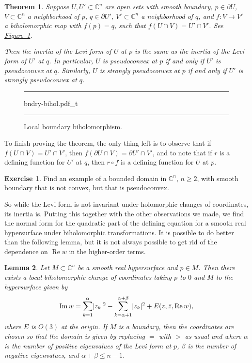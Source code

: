 \documentclass[12pt,openany]{book}
\newcommand{\avoidbreak}{\postdisplaypenalty=100}
\renewcommand{\Re}{\operatorname{Re}}
\renewcommand{\Im}{\operatorname{Im}}
\newcommand{\sabs}[1]{\lvert {#1} \rvert}
\newcommand{\C}{{\mathbb{C}}}
\theoremstyle{plain}
\newtheorem{thm}{Theorem}[section]
\newtheorem{lemma}[thm]{Lemma}
\theoremstyle{remark}
\theoremstyle{definition}
\newenvironment{exbox}{%
    \def\FrameCommand{\vrule width 1pt \relax\hspace{10pt}}%
    \MakeFramed{\advance\hsize-\width\FrameRestore}%
}{%
    \endMakeFramed
}
\newenvironment{myfig}{%
\begin{figure}[h!t]
\noindent\rule{\textwidth}{0.5pt}\vspace{12pt}\par\centering}%
{\par\noindent\rule{\textwidth}{0.5pt}
\end{figure}}
\theoremstyle{exercise}
\newtheorem{exercise}{Exercise}[section]
\theoremstyle{example}
\newcommand{\figureref}[1]{\hyperref[#1]{Figure~\ref*{#1}}}
\begin{document}
\begin{thm}
\pagebreak[2]
Suppose $U, U' \subset \C^n$ are open sets with smooth boundary,
$p \in \partial U$, $V \subset \C^n$ a neighborhood of $p$,
$q \in \partial U'$, $V' \subset \C^n$ a neighborhood of $q$,
and $f \colon V \to V'$ a biholomorphic map with $f(p) = q$, such that
$f(U \cap V) = U' \cap V'$.
See \figureref{fig:bndry-bihol}.

Then the inertia of the Levi form of $U$ at $p$ is the same as the inertia of
the Levi form of $U'$ at $q$.
In particular, $U$ is pseudoconvex at $p$ if and only if $U'$ is pseudoconvex at $q$.
Similarly,
$U$ is strongly pseudoconvex at $p$ if and only if $U'$ is strongly pseudoconvex at $q$.
\end{thm}

\begin{myfig}
{bndry-bihol.pdf_t}
\caption{Local boundary biholomorphism.\label{fig:bndry-bihol}}
\end{myfig}

To finish proving the theorem, the only thing left is to observe that if
$f(U \cap V) = U' \cap V'$, then $f(\partial U \cap V) = \partial U' \cap
V'$, and to note that if $r$ is a defining function for $U'$ at $q$,
then $r \circ f$ is a defining function for $U$ at $p$.

\begin{exbox}
\begin{exercise}
Find an example of a bounded domain in $\C^n$, $n \geq 2$, with smooth boundary that is not convex,
but that is pseudoconvex.
\end{exercise}
\end{exbox}

So while the Levi form is not invariant under holomorphic changes of coordinates,
its inertia is.
Putting this together with the other observations we made,
we find the normal form for the
quadratic part of the defining equation for a smooth real hypersurface
under biholomorphic transformations.
It is possible to do better than the following lemma, but it is not always possible
to get rid of the dependence on $\Re w$ in the higher-order terms.

\begin{lemma} \label{lemma:normformquad}
Let $M \subset \C^n$ be a smooth real hypersurface and $p \in M$.  Then there
exists a local biholomorphic change of coordinates taking $p$ to $0$
and $M$ to the hypersurface given by
\begin{equation*}
\Im w = \sum_{k=1}^\alpha \sabs{z_k}^2 - \sum_{k=\alpha+1}^{\alpha+\beta}
\sabs{z_k}^2 +
E(z,\bar{z},\Re w) ,
\avoidbreak
\end{equation*}
where $E$ is $O(3)$ at the origin.
If $M$ is a boundary, then the coordinates are chosen so that
the domain is given by replacing $=$ with $>$ as usual and where
$\alpha$ is the number of positive eigenvalues of the Levi form at $p$,
$\beta$ is the number of negative eigenvalues, and $\alpha+\beta \leq n-1$.
\end{lemma}
\end{document}
